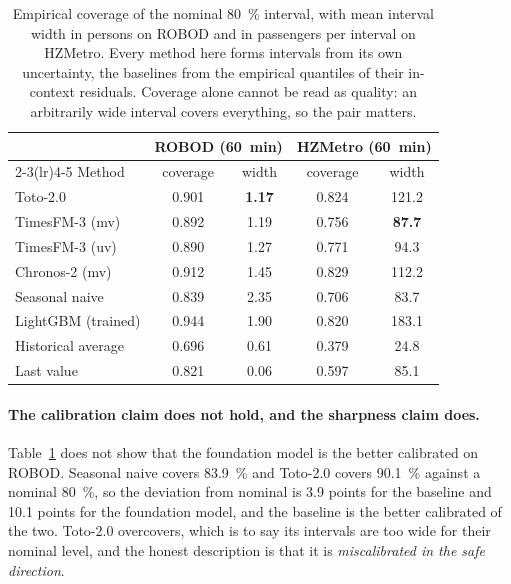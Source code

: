 \documentclass[utf8]{FrontiersinHarvard}
\newif\ifrevisionmarkup
\newcommand{\new}[1]{\ifrevisionmarkup\textcolor{revision}{#1}\else#1\fi}
\newif\ifsecondrevisionmarkup
\newcommand{\rev}[1]{\ifsecondrevisionmarkup\textcolor{revisiontwo}{#1}\else#1\fi}
\theoremstyle{plain}
\theoremstyle{definition}
\theoremstyle{remark}
\newcommand{\best}[1]{\textbf{#1}}
\begin{document}
\begin{table}[htbp]
\centering
\caption{Empirical coverage of the nominal \SI{80}{\percent} interval, with mean interval width in persons on ROBOD and in passengers per interval on HZMetro. Every method here forms intervals from its own uncertainty, the baselines from the empirical quantiles of their in-context residuals. Coverage alone cannot be read as quality: an arbitrarily wide interval covers everything, so the pair matters.}
\label{tab:calibration}
\small
\begin{tabular}{lcccc}
\toprule
& \multicolumn{2}{c}{ROBOD (\SI{60}{\minute})} & \multicolumn{2}{c}{HZMetro (\SI{60}{\minute})} \\
\cmidrule(lr){2-3}\cmidrule(lr){4-5}
Method & coverage & width & coverage & width \\
\midrule
Toto-2.0            & 0.901 & \best{1.17} & 0.824 & 121.2 \\
TimesFM-3 (mv)      & 0.892 & 1.19 & 0.756 & \best{87.7} \\
TimesFM-3 (uv)      & 0.890 & 1.27 & 0.771 & 94.3 \\
Chronos-2 (mv)      & 0.912 & 1.45 & 0.829 & 112.2 \\
\midrule
Seasonal naive      & 0.839 & 2.35 & 0.706 & 83.7 \\
LightGBM (trained)  & 0.944 & 1.90 & 0.820 & 183.1 \\
Historical average  & 0.696 & 0.61 & 0.379 & 24.8 \\
Last value          & 0.821 & 0.06 & 0.597 & 85.1 \\
\bottomrule
\end{tabular}
\end{table}

\new{\paragraph{The calibration claim does not hold, and the sharpness claim does.}
\label{sec:calib}
\rev{Table~\ref{tab:calibration} does not show that the foundation model is the better calibrated on ROBOD.} Seasonal naive covers \SI{83.9}{\percent} and Toto-2.0 covers \SI{90.1}{\percent} against a nominal \SI{80}{\percent}, so the deviation from nominal is \num{3.9} points for the baseline and \num{10.1} points for the foundation model, and the baseline is the better calibrated of the two. Toto-2.0 overcovers, which is to say its intervals are too wide for their nominal level, and the honest description is that it is \emph{miscalibrated in the safe direction}.}
\end{document}
